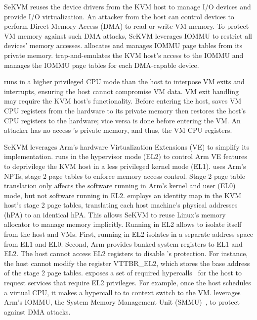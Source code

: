 SeKVM reuses the device drivers from the KVM host to manage
I/O devices and provide I/O virtualization. An attacker from the host
can control devices to perform Direct Memory Access (DMA) to
read or write VM memory. To protect VM memory against such DMA
attacks, SeKVM leverages IOMMU to restrict all devices'
memory accesses. \secore{} allocates and manages IOMMU page
tables from its private memory. \secore{} trap-and-emulates the
KVM host's access to the IOMMU and manages the IOMMU page tables
for each DMA-capable device.

\secore{} runs in a higher privileged CPU mode than the host to
interpose VM exits and interrupts, ensuring the host cannot compromise
VM data.
VM exit handling may require the KVM host's functionality. Before
entering the host, \secore{} saves VM CPU registers from the
hardware to its private memory then restores the host's CPU registers to
the hardware; vice versa is done before entering the VM. An attacker has
no access \secore{}'s private memory, and thus, the VM CPU registers.

SeKVM leverages Arm's hardware Virtualization Extensions (VE) to
simplify its implementation. \secore{} runs in the hypervisor mode
(EL2) to control Arm VE features to deprivilege the KVM host in a less
privileged kernel mode (EL1). \secore{} uses Arm's NPTs, stage 2
page tables to enforce memory access control. Stage 2 page table
translation only affects the software running in Arm's kernel and user
(EL0) mode, but not software running in EL2. \secore{} employs an
identity map in the KVM host's stage 2 page tables, translating each
host machine's physical addresses (hPA) to an identical hPA. This
allows SeKVM to reuse Linux's memory allocator to manage memory
implicitly. Running in EL2 allows \secore{} to isolate itself
from the host and VMs. First, running in EL2 isolates \secore{} in
a separate address space from EL1 and EL0. Second, Arm provides banked
system registers to EL1 and EL2. The host cannot access
EL2 registers to disable \secore{}'s protection. For instance,
the host cannot modify the register VTTBR\_EL2, which stores the base
address of the stage 2 page tables. \secore{} exposes a set of
required hypercalls~\cite{hypsec} for the host to request services
that require EL2 privileges. For example, once the host schedules
a virtual CPU, it makes a hypercall to \secore{} to context switch to
the VM. \secore{} leverages Arm's IOMMU, the System Memory
Management Unit (SMMU)~\cite{smmu-whitepaper}, to protect against
DMA attacks.

